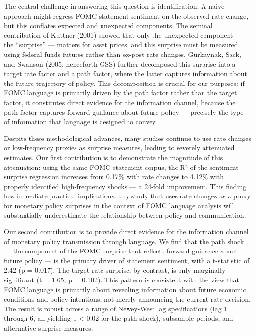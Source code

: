 \documentclass[
]{article}
\begin{document}
The central challenge in answering this question is identification. A
naive approach might regress FOMC statement sentiment on the observed
rate change, but this conflates expected and unexpected components. The
seminal contribution of Kuttner (2001) showed that only the unexpected
component --- the ``surprise'' --- matters for asset prices, and this
surprise must be measured using federal funds futures rather than
ex-post rate changes. Gürkaynak, Sack, and Swanson (2005, henceforth
GSS) further decomposed this surprise into a target rate factor and a
path factor, where the latter captures information about the future
trajectory of policy. This decomposition is crucial for our purposes: if
FOMC language is primarily driven by the path factor rather than the
target factor, it constitutes direct evidence for the information
channel, because the path factor captures forward guidance about future
policy --- precisely the type of information that language is designed
to convey.

Despite these methodological advances, many studies continue to use rate
changes or low-frequency proxies as surprise measures, leading to
severely attenuated estimates. Our first contribution is to demonstrate
the magnitude of this attenuation: using the same FOMC statement corpus,
the R² of the sentiment-surprise regression increases from 0.17\% with
rate changes to 4.12\% with properly identified high-frequency shocks
--- a 24-fold improvement. This finding has immediate practical
implications: any study that uses rate changes as a proxy for monetary
policy surprises in the context of FOMC language analysis will
substantially underestimate the relationship between policy and
communication.

Our second contribution is to provide direct evidence for the
information channel of monetary policy transmission through language. We
find that the path shock --- the component of the FOMC surprise that
reflects forward guidance about future policy --- is the primary driver
of statement sentiment, with a t-statistic of 2.42 (p = 0.017). The
target rate surprise, by contrast, is only marginally significant (t =
1.65, p = 0.102). This pattern is consistent with the view that FOMC
language is primarily about revealing information about future economic
conditions and policy intentions, not merely announcing the current rate
decision. The result is robust across a range of Newey-West lag
specifications (lag 1 through 6, all yielding p \textless{} 0.02 for the
path shock), subsample periods, and alternative surprise measures.
\end{document}
